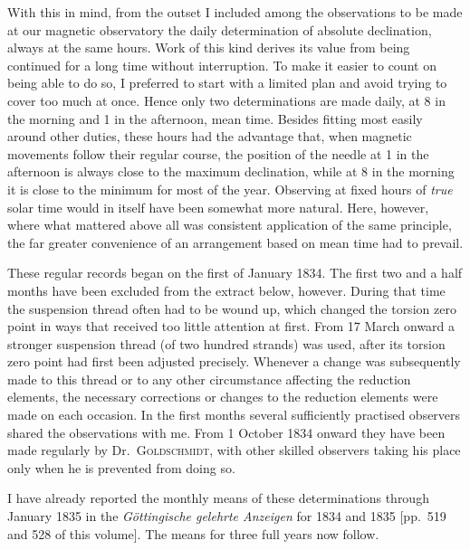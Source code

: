 With this in mind, from the outset I included among the observations to be made at our magnetic observatory the daily determination of absolute declination, always at the same hours. Work of this kind derives its value from being continued for a long time without interruption. To make it easier to count on being able to do so, I preferred to start with a limited plan and avoid trying to cover too much at once. Hence only two determinations are made daily, at 8 in the morning and 1 in the afternoon, mean time. Besides fitting most easily around other duties, these hours had the advantage that, when magnetic movements follow their regular course, the position of the needle at 1 in the afternoon is always close to the maximum declination, while at 8 in the morning it is close to the minimum for most of the year. Observing at fixed hours of \textit{true} solar time would in itself have been somewhat more natural. Here, however, where what mattered above all was consistent application of the same principle, the far greater convenience of an arrangement based on mean time had to prevail.

These regular records began on the first of January 1834. The first two and a half months have been excluded from the extract below, however. During that time the suspension thread often had to be wound up, which changed the torsion zero point in ways that received too little attention at first. From 17 March onward a stronger suspension thread (of two hundred strands) was used, after its torsion zero point had first been adjusted precisely. Whenever a change was subsequently made to this thread or to any other circumstance affecting the
reduction elements, the necessary corrections or changes to the reduction elements were made on each occasion. In the first months several sufficiently practised observers shared the observations with me. From 1 October 1834 onward they have been made regularly by Dr.~\textsc{Goldschmidt}, with other skilled observers taking his place only when he is prevented from doing so.

I have already reported the monthly means of these determinations through January 1835 in the \textit{Göttingische gelehrte Anzeigen} for 1834 and 1835 [pp.~519 and 528 of this volume]. The means for three full years now follow.

